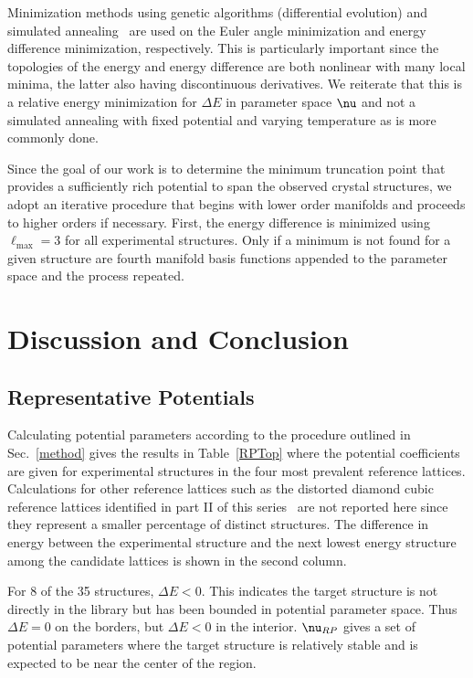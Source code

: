 \documentclass[preprint]{iucr}              %
\newcommand{\mb}[1]{\ensuremath{\mbox{\boldmath $ #1 $}}}
\begin{document}
Minimization methods using genetic algorithms (differential
evolution) and simulated annealing~\cite{Kirkpatrick83} are used on
the Euler angle minimization and energy difference minimization,
respectively. This is particularly important since the topologies of
the energy and energy difference are both nonlinear with many local
minima, the latter also having discontinuous derivatives. We
reiterate that this is a relative energy minimization for $\Delta E$ in
parameter space $\mb{\nu}$ and not a simulated annealing with fixed
potential and varying temperature as is more commonly done.

Since the goal of our work is to determine the minimum truncation point that provides a sufficiently rich potential to span the observed crystal structures, we adopt an iterative procedure that begins with lower order manifolds and proceeds to higher orders if necessary.  First, the energy difference is
minimized using $\ell_{\mathrm{max}}=3$ for all experimental
structures. Only if a minimum is not found for a given structure are
fourth manifold basis functions appended to the parameter space and
the process repeated.

\section{Discussion and Conclusion}
\label{discussion}

\subsection{Representative Potentials}
\label{representative_potentials}

Calculating potential parameters according to the procedure outlined
in Sec.~\ref{method} gives the results in Table~\ref{RPTop} where
the potential coefficients are given for experimental structures in
the four most prevalent reference lattices. Calculations for other
reference lattices such as the distorted diamond cubic reference lattices identified in part II of this series~\cite{McClurg09} are not reported here since
they represent a smaller percentage of distinct structures. The
difference in energy between the experimental structure and the next
lowest energy structure among the candidate lattices is shown in the
second column.

For 8 of the 35 structures, $\Delta E<0$. This indicates the target
structure is not directly in the library but has been bounded in potential parameter space.  Thus $\Delta E=0$ on the borders,
but $\Delta E<0$ in the interior. $\mb{\nu}_{RP}$ gives a set of
potential parameters where the target structure is relatively stable
and is expected to be near the center of the region.
\end{document}
